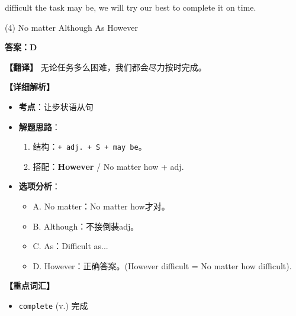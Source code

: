 \documentclass[11pt, a4paper]{article}
\newcommand{\analysis}[4]{
    \begin{solutionbox}
        \textbf{答案：#1}
        
        \textbf{【翻译】} #2
        
        \textbf{【详细解析】}
        #3
        
        \textbf{【重点词汇】}
        #4
    \end{solutionbox}
}
\newcommand{\blank}{\underline{\hspace{1.5cm}}}
\begin{document}
\begin{questions}
    \item \blank difficult the task may be, we will try our best to complete it on time.
    \begin{tasks}(4)
        \task No matter \task Although \task As \task However
    \end{tasks}
    \analysis{D}{无论任务多么困难，我们都会尽力按时完成。}{
        \begin{itemize}
            \item \textbf{考点}：让步状语从句
            \item \textbf{解题思路}：
                \begin{enumerate}
                    \item 结构：\texttt{\blank + adj. + S + may be}。
                    \item 搭配：\textbf{However} / No matter how + adj.
                \end{enumerate}
            \item \textbf{选项分析}：
                \begin{itemize}
                    \item A. No matter：No matter how才对。
                    \item B. Although：不接倒装adj。
                    \item C. As：Difficult as...
                    \item D. However：正确答案。(However difficult = No matter how difficult).
                \end{itemize}
        \end{itemize}
    }{
        \begin{itemize}
            \item \texttt{complete} (v.) 完成
        \end{itemize}
    }


\end{questions}
\end{document}
